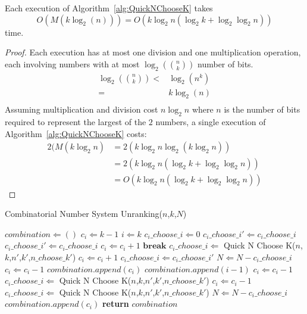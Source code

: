 \begin{theorem}
\label{theorem:QuickNChooseKcomplexity}
Each execution of Algorithm~\ref{alg:QuickNChooseK} takes $$O\left(M(k \log_2(n))\right) = O \left(k\log_2 n(\log_2 k+\log_2\log_2 n)\right)$$ time.
\end{theorem}
\begin{proof}
Each execution has at most one division and one multiplication operation, each involving numbers with at most $\log_2({n \choose k})$ number of bits.
\begin{align}
\log_2 \left({n \choose k} \right) <& \log_2(n^k) \\
=& k\log_2(n) \\
\end{align}
Assuming multiplication and division cost $n \log_2 n$ where $n$ is the number of bits required to represent the largest of the $2$ numbers, a single execution of Algorithm~\ref{alg:QuickNChooseK} costs:
\begin{align}
2 (M(k\log_2 n ) &= 2 (k\log_2 n\log_2(k\log_2 n)) \\
&= 2 (k\log_2 n(\log_2 k+\log_2\log_2 n)) \\
&= O\left(k\log_2 n(\log_2 k+\log_2\log_2 n)\right)
\end{align}
\end{proof}

\begin{algorithm}[H]
  \caption{Combinatorial Number System Unranking($n$,$k$,$N$)}  \label{alg:CNS}
  \begin{algorithmic}[1]
  \State $\mathit{combination} \Longleftarrow ()$
  \State $\mathit{c_i} \Longleftarrow k-1$
  \State $i \Longleftarrow k$
  \State $\mathit{c_{i}\_choose\_i} \Longleftarrow 0$
  \State $\mathit{c_{i}\_choose\_i'} \Longleftarrow \mathit{c_{i}\_choose\_i}$
    \State $\mathit{c_{i}\_choose\_i'} \Longleftarrow \mathit{c_{i}\_choose\_i}$
        \State $c_i \Longleftarrow c_i + 1$
        \State $\mathbf{break}$
    \EndIf
    \State $\mathit{c_{i}\_choose\_i} \Longleftarrow$ Quick N Choose K($n$,$k$,$n'$,$k'$,$\mathit{n\_choose\_k'}$) \label{alg:CNS:quick1}
  \State $c_i \Longleftarrow c_i + 1$ 
  \EndWhile
  \State $\mathit{c_{i}\_choose\_i} \Longleftarrow \mathit{c_{i}\_choose\_i'}$
  \State $N \Longleftarrow N - \mathit{c_{i}\_choose\_i}$
  \State $c_i \Longleftarrow c_i - 1$
  \State $\mathit{combination}.\mathit{append}(c_i)$
  \State $\mathit{combination}.\mathit{append}(i - 1)$
  \Else
  \State $c_i \Longleftarrow c_i - 1$
  \State $\mathit{c_{i}\_choose\_i} \Longleftarrow$ Quick N Choose K($n$,$k$,$n'$,$k'$,$\mathit{n\_choose\_k'}$) \label{alg:CNS:quick2}
  \State $c_i \Longleftarrow c_i - 1$
  \State $\mathit{c_{i}\_choose\_i} \Longleftarrow$ Quick N Choose K($n$,$k$,$n'$,$k'$,$\mathit{n\_choose\_k'}$) \label{alg:CNS:quick3}
  \EndWhile
  \State $N \Longleftarrow N - \mathit{c_{i}\_choose\_i}$
  \State $\mathit{combination}.\mathit{append}(c_i)$
  \EndIf
  \EndFor
  \State \textbf{return} $\mathit{combination}$
  \end{algorithmic}
\end{algorithm}

